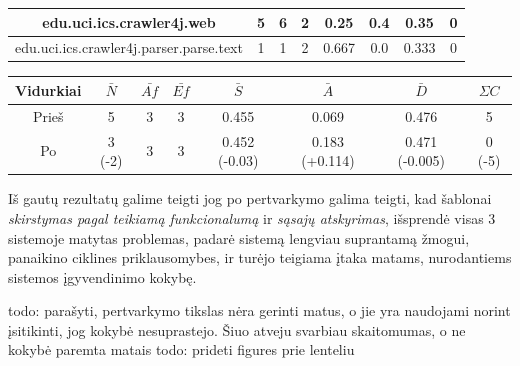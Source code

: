 \begin{center}
\begin{tabular}{|c|c|c|c|c|c|c|c|}
        \hline
        edu.uci.ics.crawler4j.web & 5 & 6 & 2 & 0.25 & 0.4 & 0.35 & 0 \\
        \hline
        edu.uci.ics.crawler4j.parser.parse.text & 1 & 1 & 2 & 0.667 & 0.0 & 0.333 & 0 \\
        \hline
    \end{tabular}
    \begin{tabular}{|c|c|c|c|c|c|c|c|}
        \hline
        Vidurkiai & $\bar{N}$ & $\bar{Af}$ & $\bar{Ef}$ & $\bar{S}$ & $\bar{A}$ & $\bar{D}$ & $\Sigma C$\\ [0.5ex]
        \hline\hline
        Prieš & 5 & 3 & 3 & 0.455 & 0.069 & 0.476 & 5\\
        \hline
        Po  & \cellcolor{green!25} 3 (-2) & 3 & 3 & \cellcolor{green!24} 0.452 (-0.03) & \cellcolor{green!25} 0.183 (+0.114) & \cellcolor{green!25} 0.471 (-0.005) & \cellcolor{green!25} 0 (-5)\\
        \hline
    \end{tabular}
\end{center}
Iš gautų rezultatų galime teigti jog po pertvarkymo galima teigti, kad šablonai \textit{skirstymas pagal teikiamą funkcionalumą} ir \textit{sąsajų atskyrimas}, išsprendė visas 3 sistemoje matytas problemas,
padarė sistemą lengviau suprantamą žmogui, panaikino ciklines priklausomybes, ir turėjo teigiama įtaka matams, nurodantiems
sistemos įgyvendinimo kokybę.

todo: parašyti, pertvarkymo tikslas nėra gerinti matus, o jie yra naudojami norint įsitikinti, jog kokybė nesuprastejo. Šiuo atveju svarbiau skaitomumas, o ne kokybė paremta matais
todo: prideti figures prie lenteliu